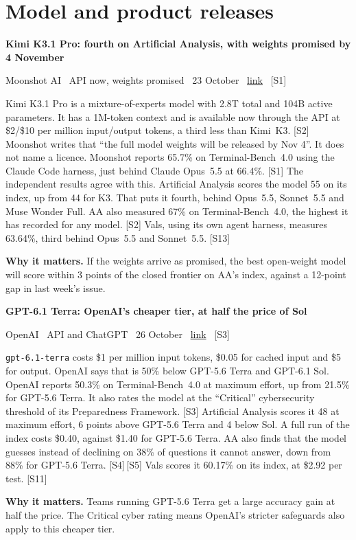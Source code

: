 \documentclass[11pt,a4paper]{article}
\newcommand{\entry}[4]{%
  \par\Needspace{7\baselineskip}\vspace{0.7em}%
  {\sffamily\bfseries\color{brandink}#1}\par
  {\footnotesize\color{brandgrey}#2 \textbullet\ \href{#3}{link} \textbullet\ \srcref{#4}}\par
  \vspace{0.15em}}
\newcommand{\why}[1]{\par{\small\textbf{Why it matters.} #1}\par}
\newcommand{\srcref}[1]{\textcolor{brandaccent}{[S#1]}}
\begin{document}
\section{Model and product releases}

\entry{Kimi K3.1 Pro: fourth on Artificial Analysis, with weights promised by 4 November}{Moonshot AI \textbullet\ API now, weights promised \textbullet\ 23 October}{https://www.kimi.com/en/blog/kimi-k3-1-pro}{1}
Kimi K3.1 Pro is a mixture-of-experts model with 2.8T total and 104B active parameters. It has a 1M-token context and is
available now through the API at \$2/\$10 per million input/output tokens, a third less than Kimi~K3. \srcref{2} Moonshot writes that
``the full model weights will be released by Nov 4''. It does not name a licence. Moonshot reports 65.7\% on Terminal-Bench~4.0
using the Claude Code harness, just behind Claude Opus~5.5 at 66.4\%. \srcref{1} The independent results agree with this. Artificial Analysis scores the model 55 on its index, up from 44 for
K3. That puts it fourth, behind Opus~5.5, Sonnet~5.5 and Muse Wonder Full. AA also measured 67\% on Terminal-Bench~4.0, the highest it has recorded for any model. \srcref{2}
Vals, using its own agent harness, measures 63.64\%, third behind Opus~5.5 and Sonnet~5.5. \srcref{13}
\why{If the weights arrive as promised, the best open-weight model will score within 3 points of the closed frontier on AA's index, against a 12-point gap in last week's issue.}

\entry{GPT-6.1 Terra: OpenAI's cheaper tier, at half the price of Sol}{OpenAI \textbullet\ API and ChatGPT \textbullet\ 26 October}{https://openai.com/index/introducing-gpt-6-1-terra/}{3}
\texttt{gpt-6.1-terra} costs \$1 per million input tokens, \$0.05 for cached input and \$5 for output. OpenAI says that is 50\% below
GPT-5.6 Terra and GPT-6.1 Sol. OpenAI reports 50.3\% on Terminal-Bench~4.0 at maximum effort, up from 21.5\% for GPT-5.6 Terra. It also rates the model at the
``Critical'' cybersecurity threshold of its Preparedness Framework. \srcref{3} Artificial Analysis scores it 48 at maximum effort,
6 points above GPT-5.6 Terra and 4 below Sol. A full run of the index costs \$0.40, against \$1.40 for GPT-5.6 Terra. AA also finds that the model guesses instead of declining on 38\% of questions it cannot answer, down from 88\% for GPT-5.6 Terra. \srcref{4}\,\srcref{5} Vals scores it 60.17\% on its index,
at \$2.92 per test. \srcref{11}
\why{Teams running GPT-5.6 Terra get a large accuracy gain at half the price. The Critical cyber rating means OpenAI's stricter safeguards also apply to this cheaper tier.}
\end{document}

